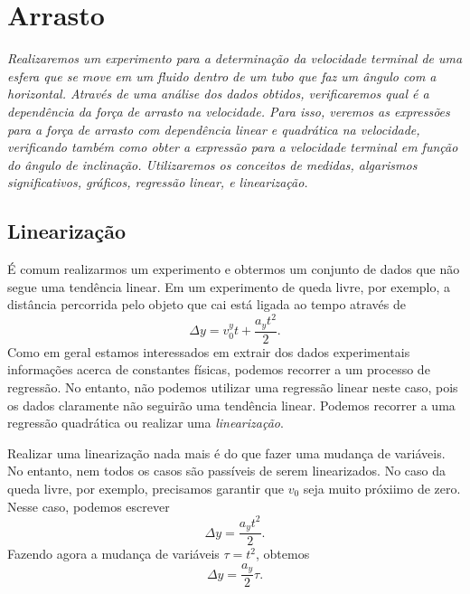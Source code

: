 \chapter{Arrasto} %
\label{Chap:ExpArrasto}        %

\begin{fullwidth}\it
	Realizaremos um experimento para a determinação da velocidade terminal de uma esfera que se move em um fluido dentro de um tubo que faz um ângulo com a horizontal. Através de uma análise dos dados obtidos, verificaremos qual é a dependência da força de arrasto na velocidade. Para isso, veremos as expressões para a força de arrasto com dependência linear e quadrática na velocidade, verificando também como obter a expressão para a velocidade terminal em função do ângulo de inclinação. Utilizaremos os conceitos de medidas, algarismos significativos, gráficos, regressão linear, e linearização.
\end{fullwidth}

\section{Linearização}

É comum realizarmos um experimento e obtermos um conjunto de dados que não segue uma tendência linear. Em um experimento de queda livre, por exemplo, a distância percorrida pelo objeto que cai está ligada ao tempo através de
\begin{equation}
	\Delta y = v_0^y t + \frac{a_yt^2}{2}.
\end{equation}
%
Como em geral estamos interessados em extrair dos dados experimentais informações acerca de constantes físicas, podemos recorrer a um processo de regressão. No entanto, não podemos utilizar uma regressão linear neste caso, pois os dados claramente não seguirão uma tendência linear. Podemos recorrer a uma regressão quadrática ou realizar uma \emph{linearização}.

Realizar uma linearização nada mais é do que fazer uma mudança de variáveis. No entanto, nem todos os casos são passíveis de serem linearizados. No caso da queda livre, por exemplo, precisamos garantir que $v_0$ seja muito próxiimo de zero. Nesse caso, podemos escrever
\begin{equation}
	\Delta y = \frac{a_yt^2}{2}.
\end{equation}
%
Fazendo agora a mudança de variáveis $\tau = t^2$, obtemos
\begin{equation}
	\Delta y = \frac{a_y}{2}\tau.
\end{equation}

